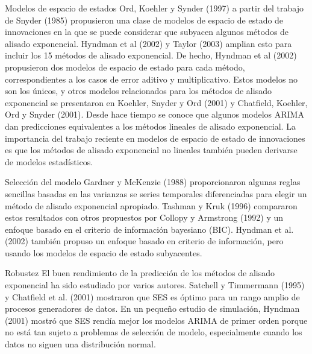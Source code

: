 \documentclass{llncs}
\begin{document}
Modelos de espacio de estados
Ord, Koehler y Synder (1997) a partir del trabajo de Snyder (1985) propusieron una clase de modelos de espacio de estado de innovaciones en la que se puede considerar que subyacen algunos métodos de alisado exponencial. Hyndman et al (2002) y Taylor (2003) amplian esto para incluir los 15 métodos de alisado exponencial. De hecho, Hyndman et al (2002) propusieron dos modelos de espacio de estado para cada método, correspondientes a los casos de error aditivo y multiplicativo. Estos modelos no son los únicos, y otros modelos relacionados para los métodos de alisado exponencial se presentaron en Koehler, Snyder y Ord (2001) y Chatfield, Koehler, Ord y Snyder (2001). Desde hace tiempo se conoce que algunos modelos ARIMA dan predicciones equivalentes a los métodos lineales de alisado exponencial. La importancia del trabajo reciente en modelos de espacio de estado de innovaciones es que los métodos de alisado exponencial no lineales también pueden derivarse de modelos estadísticos.

Selección del modelo
Gardner y McKenzie (1988) proporcionaron algunas reglas sencillas basadas en las varianzas se series temporales diferenciadas para elegir un método de alisado exponencial apropiado. Tashman y Kruk (1996) compararon estos resultados con otros propuestos por Collopy y Armstrong (1992) y un enfoque basado en el criterio de información bayesiano (BIC). Hyndman et al. (2002) también propuso un enfoque basado en criterio de información, pero usando los modelos de espacio de estado subyacentes.

Robustez
El buen rendimiento de la predicción de los métodos de alisado exponencial ha sido estudiado por varios autores. Satchell y Timmermann (1995) y Chatfield et al. (2001) mostraron que SES es óptimo para un rango amplio de procesos generadores de datos. En un pequeño estudio de simulación, Hyndman (2001) mostró que SES rendía mejor los modelos ARIMA de primer orden porque no está tan sujeto a problemas de selección de modelo, especialmente cuando los datos no siguen una distribución normal.
\end{document}
